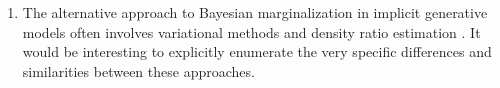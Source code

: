 \documentclass[11pt]{article}
\begin{document}
\begin{enumerate}
\item The alternative approach to Bayesian marginalization in implicit generative models often involves variational methods and density ratio estimation \citep{tran2017deep, mohamed2016learning}.  It would be interesting to explicitly enumerate the very specific differences and similarities between these approaches.
\end{enumerate}

 
   
 






\end{document}
